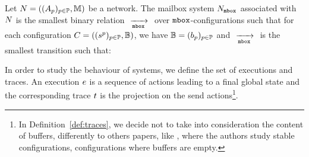 \documentclass[submission,copyright,creativecommons,UKenglish]{eptcs}
\begin{document}
\begin{definition}\label{def:mailboxSystem}
Let $\Network = \left((\Automaton{p})_{p\in \Part}, \messageSet\right)$ be a network.
The mailbox system $\System{N}{\mailbox}{}$ associated with $\Network$  is the smallest binary relation
  $\TransitionAsync{}{}{}{\mailbox}{}$ over $\mailbox$-configurations such that %
for each configuration $C = \left( (\state{s}{}{p})_{p \in \Part}, \bufferSet\right)$, we have  
 $\bufferSet= (b_{p})_{p \in \Part}$ %
and 
 $\TransitionAsync{}{}{}{\mailbox}{}$ is the smallest transition such that: 
\begin{prooftree}
\end{prooftree}

\begin{prooftree}
\end{prooftree}
\end{definition}



In order to study the behaviour of systems, we define the set of executions and traces. An execution $\exec$ is a sequence of actions leading to a final global state and the corresponding trace $\trace$ is the projection on the send actions\footnote{In Definition~\ref{def:traces}, we decide not to take into consideration the content of buffers, differently to others papers, like \cite{finkel_synchronizability_2017}, where the authors study stable configurations, \ie configurations where buffers are empty.}.
\end{document}
